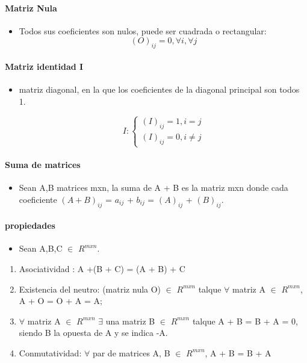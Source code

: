 \documentclass[a4paper]{article}
\begin{document}
\paragraph{Matriz Nula}
\begin{itemize}
	\item Todos sus coeficientes son nulos, puede ser cuadrada o rectangular: 
	\begin{equation}
	(O)_{ij} = 0, \forall i , \forall j
	\end{equation}
\end{itemize}

\paragraph{Matriz identidad I}
\begin{itemize}
\item matriz diagonal, en la que los coeficientes de la diagonal principal son todos 1.

\begin{equation}
	I : \begin{cases}
			(I)_{ij} = 1,  i = j \\
			(I)_{ij} = 0,  i \neq j		
		\end{cases}
\end{equation}
\end{itemize}

\paragraph{Suma de matrices}
\begin{itemize}
	\item Sean A,B matrices mxn, la suma de A + B es la matriz mxn donde cada coeficiente $(A + B)_{ij}$ = $a_{ij}$ + $b_{ij}$ = $(A)_{ij}$ + $(B)_{ij}$.
\end{itemize}

\paragraph{propiedades}
\begin{itemize}
	\item Sean A,B,C $\in$ $R^{mxn}$.
\end{itemize}

\begin{enumerate}
	\item Asociatividad : A +(B + C) = (A + B) + C
	\item Existencia del neutro: (matriz nula O) $\in$ $R^{mxn}$ talque $\forall$ matriz A $\in$ $R^{mxn}$, A + O = O + A = A;
	\item $\forall$ matriz A $\in$ $R^{mxn}$ $\exists$ una matriz B  $\in$ $R^{mxn}$ talque A + B = B + A = 0, siendo B la opuesta de A y se indica -A.
	\item Conmutatividad:  $\forall$ par de matrices A, B $\in$ $R^{mxn}$, A + B = B + A
\end{enumerate}
\end{document}
